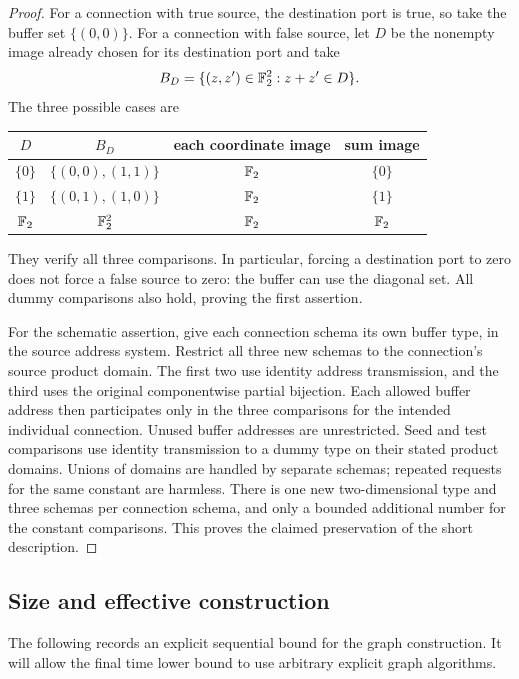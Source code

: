 \begin{proof}
For a connection with true source, the destination port is true, so take
the buffer set $\{(0,0)\}$. For a connection with false source, let $D$ be
the nonempty image already chosen for its destination port and take
\[
 B_D=\{(z,z')\in\mathbb{F}_2^2:z+z'\in D\}.
\]
The three possible cases are
\begin{center}
\begin{tabular}{@{}cccc@{}}
\toprule
$D$ & $B_D$ & each coordinate image & sum image \\
\midrule
$\{0\}$ & $\{(0,0),(1,1)\}$ & $\mathbb{F}_2$ & $\{0\}$ \\
$\{1\}$ & $\{(0,1),(1,0)\}$ & $\mathbb{F}_2$ & $\{1\}$ \\
$\mathbb{F}_2$ & $\mathbb{F}_2^2$ & $\mathbb{F}_2$ & $\mathbb{F}_2$ \\
\bottomrule
\end{tabular}
\end{center}
They verify all three comparisons. In particular, forcing a destination
port to zero does not force a false source to zero: the buffer can use the
diagonal set. All dummy comparisons also hold, proving the first assertion.

For the schematic assertion, give each connection schema its own buffer
type, in the source address system. Restrict all three new schemas to the
connection's source product domain. The first two use identity address
transmission, and the third uses the original componentwise partial
bijection. Each allowed buffer address then participates only in the three
comparisons for the intended individual connection. Unused buffer addresses
are unrestricted. Seed and test comparisons use identity transmission to a
dummy type on their stated product domains. Unions of domains are handled
by separate schemas; repeated requests for the same constant are harmless.
There is one new two-dimensional type and three schemas per connection
schema, and only a bounded additional number for the constant comparisons.
This proves the claimed preservation of the short description.
\end{proof}

\subsection{Size and effective construction}

The following records an explicit sequential bound for the graph construction.
It will allow the final time lower bound to use arbitrary explicit graph
algorithms.

